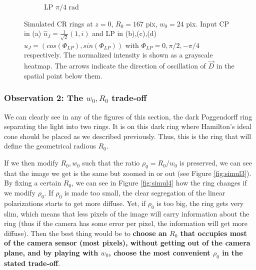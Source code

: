 \documentclass[11pt, a4paper, twoside]{article} %
\begin{document}
\begin{figure}[h!]
\begin{subfigure}[b]{0.245\linewidth}
     \caption{LP $\pi/4$ rad}
     \end{subfigure}
    \caption{Simulated CR rings at $z=0$, $R_0=167$ pix, $w_0=24$ pix. Input CP in (a) $\hat{u}_J=\frac{1}{\sqrt{2}}(1,i)$ and LP in (b),(c),(d) $\hat{u}_J=(cos(\Phi_{LP}),sin(\Phi_{LP}))$ with $\Phi_{LP}=0,\pi/2,-\pi/4$ respectively. The normalized intensity is shown as a grayscale heatmap. The arrows indicate the direction of oscillation of $\vec{D}$ in the spatial point below them.}
            \label{fig:simul2}

\end{figure}

\subsubsection*{Observation 2: The $w_0,R_0$ trade-off}
We can clearly see in any of the figures of this section, the dark Poggendorff ring separating the light into two rings. It is on this dark ring where Hamilton's ideal cone should be placed as we described previously. Thus, this is the ring that will define the geometrical radious $R_0$. 

If we then modify $R_0,w_0$ such that the ratio $\rho_0=R_0/w_0$ is preserved, we can see that the image we get is the same but zoomed in or out (see Figure \ref{fig:simul3}). By fixing a certain $R_0$, we can see in Figure \ref{fig:simul4} how the ring changes if we modify $\rho_0$. If $\rho_0$ is made too small, the clear segregation of the linear polarizations starts to get more diffuse. Yet, if $\rho_0$ is too big, the ring gets very slim, which means that less pixels of the image will carry information about the ring (thus if the camera has some error per pixel, the information will get more diffuse). Then the best thing would be to {\bf choose an $R_0$ that occupies most of the camera sensor (most pixels), without getting out of the camera plane, and by playing with $w_0$, choose the most convenient $\rho_0$ in the stated trade-off}.
\end{document}
